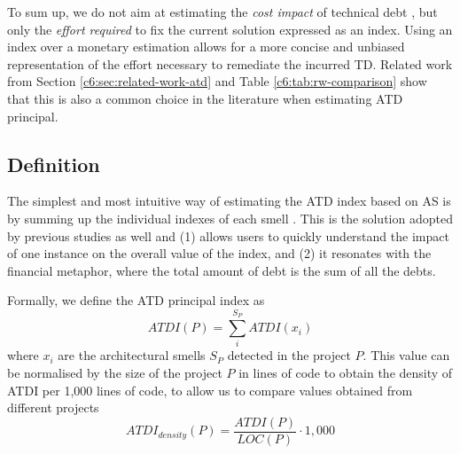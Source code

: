 To sum up, we do not aim at estimating the \emph{cost impact} of technical debt \cite{Avgeriou2016}, but only the \emph{effort required} to fix the current solution \cite{Avgeriou2016} expressed as an index. 
Using an index over a monetary estimation allows for a more concise and unbiased representation of the effort necessary to remediate the incurred TD. 
Related work from Section \ref{c6:sec:related-work-atd} and Table \ref{c6:tab:rw-comparison} show that this is also a common choice in the literature when estimating ATD principal.

\subsection{Definition}\label{c6:sec:approach-definition}
The simplest and most intuitive way of estimating the ATD index based on AS is by summing up the individual indexes of each smell \cite{Ampatzoglou2018}.
This is the solution adopted by previous studies as well \cite{Letouzey2010,Curtis2012,Marinescu2012,Roveda2018} and (1) allows users to quickly understand the impact of one instance on the overall value of the index, and (2) it resonates with the financial metaphor, where the total amount of debt is the sum of all the debts.

Formally, we define the ATD principal index as
\begin{equation}\label{c6:eq:atdi}
    ATDI(P) =  \sum_i^{S_P} ATDI(x_i)
\end{equation}
where $x_i$ are the architectural smells $S_P$ detected in the project $P$.
This value can be normalised by the size of the project $P$ in lines of code to obtain the density of ATDI per 1,000 lines of code, to allow us to compare values obtained from different projects
\begin{equation}\label{c6:eq:atdi-normalised}
    ATDI_{density}(P) = \frac{ATDI(P)}{LOC(P)} \cdot 1,000
\end{equation}

